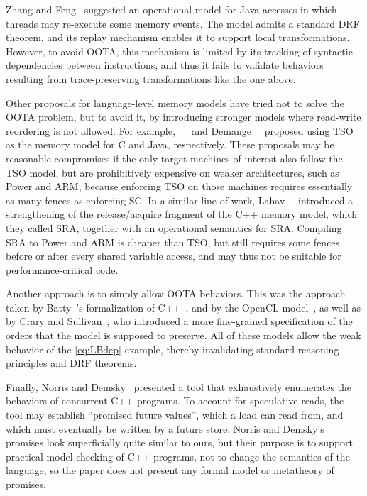 Zhang and Feng~\cite{Zhang2016} suggested an operational model for Java accesses in which threads may re-execute some memory events.
The model admits a standard DRF theorem, and its replay mechanism enables it to support local transformations.
However, to avoid OOTA, this mechanism is limited by its tracking of syntactic dependencies between instructions,
and thus it fails to validate behaviors resulting from trace-preserving transformations like the one above.

Other proposals for language-level memory models have tried not to solve the OOTA problem, but to avoid it,
by introducing stronger models where read-write reordering is not allowed.
For example, \sevcik~\etal~\cite{compcerttso} and Demange~\etal~\cite{bmm} proposed using TSO as the memory model for C and Java, respectively. 
These proposals may be reasonable compromises if the only target machines of interest also follow the TSO model,
but are prohibitively expensive on weaker architectures, such as Power and ARM,
because enforcing TSO on those machines requires essentially as many fences as enforcing SC.
In a similar line of work, Lahav~\etal~\cite{sra} introduced a strengthening of the release/acquire fragment of the C++ memory model, which they called SRA, together with an operational semantics for SRA\@.
Compiling SRA to Power and ARM is cheaper than TSO, but still requires some fences before or after every shared variable access, and may thus not be suitable for performance-critical code.

Another approach is to simply allow OOTA behaviors.
This was the approach taken by Batty~\etal's formalization of C++~\cite{Batty:2011}, and by the OpenCL model~\cite{opencl-model},
as well as by Crary and Sullivan~\cite{Crary2015}, who introduced a more fine-grained specification of the orders that the model is supposed to preserve.
All of these models allow the weak behavior of the \ref{eq:LBdep} example, thereby invalidating standard reasoning principles and DRF theorems.

Finally, Norris and Demsky~\cite{CDSchecker} presented a tool
that exhaustively enumerates the behaviors of concurrent C++ programs.
To account for speculative reads, the tool may establish ``promised
future values'', which a load can read from, and which must eventually
be written by a future store.  Norris and Demsky's promises look
superficially quite similar to ours, but their purpose is to support
practical model checking of C++ programs, not to change the semantics
of the language, so the paper does not present any formal model or
metatheory of promises.



